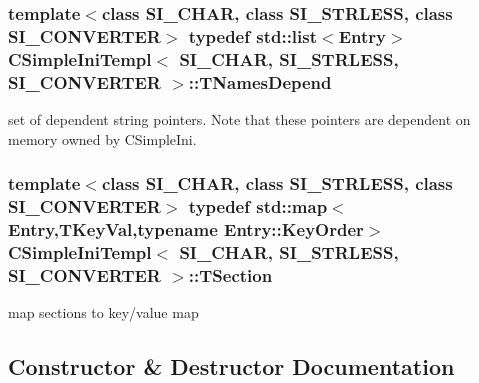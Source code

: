 \subsubsection[{\texorpdfstring{T\+Names\+Depend}{TNamesDepend}}]{\setlength{\rightskip}{0pt plus 5cm}template$<$class S\+I\+\_\+\+C\+H\+AR, class S\+I\+\_\+\+S\+T\+R\+L\+E\+SS, class S\+I\+\_\+\+C\+O\+N\+V\+E\+R\+T\+ER$>$ typedef std\+::list$<${\bf Entry}$>$ {\bf C\+Simple\+Ini\+Templ}$<$ S\+I\+\_\+\+C\+H\+AR, S\+I\+\_\+\+S\+T\+R\+L\+E\+SS, S\+I\+\_\+\+C\+O\+N\+V\+E\+R\+T\+ER $>$\+::{\bf T\+Names\+Depend}}\hypertarget{classCSimpleIniTempl_a391b3f3751e06cd9e9de4fb16ac14342}{}\label{classCSimpleIniTempl_a391b3f3751e06cd9e9de4fb16ac14342}
set of dependent string pointers. Note that these pointers are dependent on memory owned by C\+Simple\+Ini. 
\subsubsection[{\texorpdfstring{T\+Section}{TSection}}]{\setlength{\rightskip}{0pt plus 5cm}template$<$class S\+I\+\_\+\+C\+H\+AR, class S\+I\+\_\+\+S\+T\+R\+L\+E\+SS, class S\+I\+\_\+\+C\+O\+N\+V\+E\+R\+T\+ER$>$ typedef std\+::map$<${\bf Entry},{\bf T\+Key\+Val},typename {\bf Entry\+::\+Key\+Order}$>$ {\bf C\+Simple\+Ini\+Templ}$<$ S\+I\+\_\+\+C\+H\+AR, S\+I\+\_\+\+S\+T\+R\+L\+E\+SS, S\+I\+\_\+\+C\+O\+N\+V\+E\+R\+T\+ER $>$\+::{\bf T\+Section}}\hypertarget{classCSimpleIniTempl_a2e7963455f680abd0d6901786495a665}{}\label{classCSimpleIniTempl_a2e7963455f680abd0d6901786495a665}
map sections to key/value map 

\subsection{Constructor \& Destructor Documentation}
